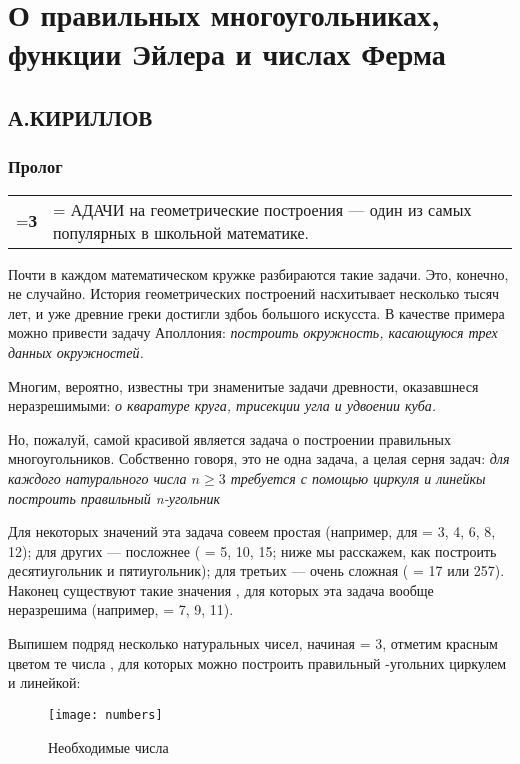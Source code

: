\section*{\center\Huge О правильных многоугольниках,\\функции Эйлера и числах Ферма}
\setcounter{page}{15} %
\subsection*{\center\sffamily А.КИРИЛЛОВ}
\begin{multicols}{3}
\subsubsection{Пролог}

\flushleft
\begin{tabularx}{\linewidth}
{>{\hsize=1\hsize\linewidth=\hsize}X
>{\hsize=14.75\hsize\linewidth=\hsize}X}
\\ [-25pt] %
\textbf{\fontsize{50}{60}\selectfont З} & АДАЧИ на геометрические построения — один из самых популярных в школьной математике.
\end{tabularx}
\justifying

Почти в каждом математическом
кружке разбираются такие задачи.
Это, конечно, не случайно. История
геометрических построений насхитывает несколько тысяч лет, и уже
древние греки достигли здбоь большого искусста. В качестве примера
можно привести задачу Аполлония:
\textit{построить окружность, касающуюся трех данных окружностей.}

Многим, вероятно, известны три
знаменитые задачи древности, оказавшнеся неразрешимыми: \textit{о кваратуре круга, трисекции угла и удвоении куба.}

Но, пожалуй, самой красивой является задача о построении правильных многоугольников. Собственно говоря, это не одна задача, а целая
серня задач: \textit{для каждого натурального числа $n \ge 3$ требуется с помощью циркуля и линейкы построить правильный n-угольник}

Для некоторых значений \n эта задача совеем простая (например, для \n = 3, 4, 6, 8, 12); для других — посложнее ( \n = 5, 10, 15; ниже мы расскажем, как построить десятиугольник и пятиугольник); для третьих — очень
сложная ( \n = 17 или 257). Наконец
существуют такие значения \n, для
которых эта задача вообще неразрешима (например, \n = 7, 9, 11).

Выпишем подряд несколько натуральных чисел, начиная \n = 3,
отметим красным цветом те числа \n,
для которых можно построить правильный \n-угольних циркулем и линейкой:
\begin{figure}[H]
  \texttt{[image: numbers]}
  \caption{Необходимые числа}
\end{figure}


\end{multicols}
